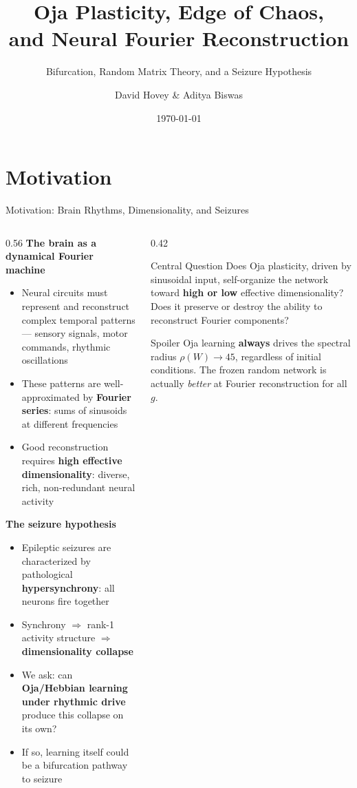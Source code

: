 \documentclass[11pt,aspectratio=169]{beamer}
\title[Oja Plasticity \& Chaos]{Oja Plasticity, Edge of Chaos,\\and Neural Fourier Reconstruction}
\subtitle{Bifurcation, Random Matrix Theory, and a Seizure Hypothesis}
\author[Hovey \& Biswas]{David Hovey \& Aditya Biswas}
\institute{Princeton University --- MAE541 Final Project}
\date{\today}
\begin{document}
{
\begin{frame}
  \titlepage
\end{frame}
}
\addtocounter{framenumber}{-1}

\section{Motivation}

\begin{frame}{Motivation: Brain Rhythms, Dimensionality, and Seizures}

\begin{columns}[T]
\begin{column}{0.56\textwidth}
\textbf{The brain as a dynamical Fourier machine}
\begin{itemize}
  \item Neural circuits must represent and reconstruct complex temporal patterns
        --- sensory signals, motor commands, rhythmic oscillations
  \item These patterns are well-approximated by \textbf{Fourier series}:
        sums of sinusoids at different frequencies
  \item Good reconstruction requires \textbf{high effective dimensionality}:
        diverse, rich, non-redundant neural activity
\end{itemize}

\vspace{0.4em}
\textbf{The seizure hypothesis}
\begin{itemize}
  \item Epileptic seizures are characterized by pathological \textbf{hypersynchrony}:
        all neurons fire together
  \item Synchrony $\Rightarrow$ rank-1 activity structure $\Rightarrow$
        \textbf{dimensionality collapse}
  \item We ask: can \textbf{Oja/Hebbian learning under rhythmic drive}
        produce this collapse on its own?
  \item If so, learning itself could be a bifurcation pathway to seizure
\end{itemize}
\end{column}
\begin{column}{0.42\textwidth}
\begin{block}{Central Question}
Does Oja plasticity, driven by sinusoidal input, self-organize the network
toward \textbf{high or low} effective dimensionality?
Does it preserve or destroy the ability to reconstruct Fourier components?
\end{block}

\vspace{0.5em}
\begin{alertblock}{Spoiler}
Oja learning \textbf{always} drives the spectral radius $\rho(W) \to 45$,
regardless of initial conditions. The frozen random network is actually
\textit{better} at Fourier reconstruction for all $g$.
\end{alertblock}
\end{column}
\end{columns}
\end{frame}
\end{document}
